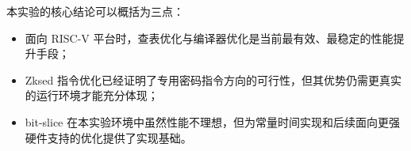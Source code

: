 本实验的核心结论可以概括为三点：
\begin{itemize}
    \item [1.]面向 RISC-V 平台时，查表优化与编译器优化是当前最有效、最稳定的性能提升手段；
    \item [2.]Zksed 指令优化已经证明了专用密码指令方向的可行性，但其优势仍需更真实的运行环境才能充分体现；
    \item [3.]bit-slice 在本实验环境中虽然性能不理想，但为常量时间实现和后续面向更强硬件支持的优化提供了实现基础。
\end{itemize}

